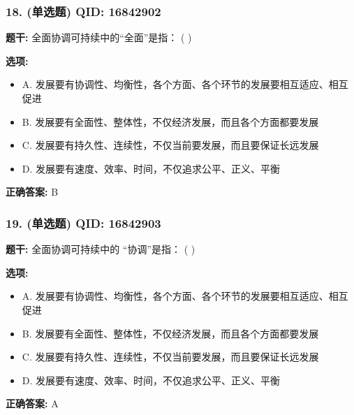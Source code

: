 \documentclass[12pt,UTF8]{ctexart}
\begin{document}
\subsubsection*{18. (单选题) \small QID: 16842902}

\textbf{题干:}
全面协调可持续中的“全面”是指： ( )

\textbf{选项:}
\begin{itemize}[leftmargin=*]

  \item A. 发展要有协调性、均衡性，各个方面、各个环节的发展要相互适应、相互促进

  \item B. 发展要有全面性、整体性，不仅经济发展，而且各个方面都要发展

  \item C. 发展要有持久性、连续性，不仅当前要发展，而且要保证长远发展

  \item D. 发展要有速度、效率、时间，不仅追求公平、正义、平衡

\end{itemize}

\textbf{正确答案:}
B

\vspace{0.3em}\hrulefill\vspace{0.7em}

\subsubsection*{19. (单选题) \small QID: 16842903}

\textbf{题干:}
全面协调可持续中的 “协调”是指： ( )

\textbf{选项:}
\begin{itemize}[leftmargin=*]

  \item A. 发展要有协调性、均衡性，各个方面、各个环节的发展要相互适应、相互促进

  \item B. 发展要有全面性、整体性，不仅经济发展，而且各个方面都要发展

  \item C. 发展要有持久性、连续性，不仅当前要发展，而且要保证长远发展

  \item D. 发展要有速度、效率、时间，不仅追求公平、正义、平衡

\end{itemize}

\textbf{正确答案:}
A
\end{document}
